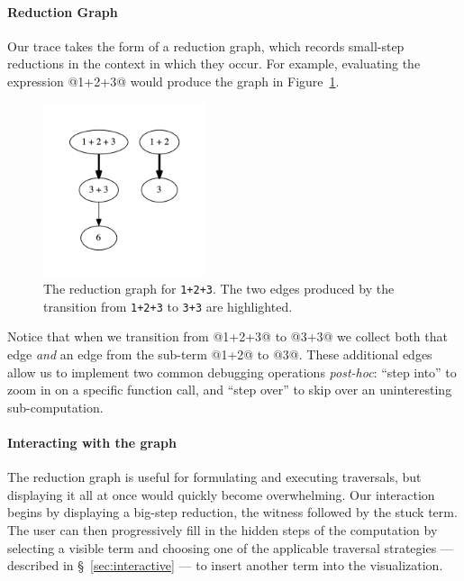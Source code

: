 \paragraph{Reduction Graph}
Our trace takes the form of a reduction graph, which records small-step
reductions in the context in which they occur.
%
%
For example, evaluating the expression @1+2+3@ would produce the
graph in Figure~\ref{fig:simple-reduction-hi}.
%
\begin{figure}[t]
  \centering
  \includegraphics[height=2in]{simple.png}
  \caption{The reduction graph for \texttt{1+2+3}. The two edges
    produced by the transition from \texttt{1+2+3} to \hbox{\texttt{3+3}}
    are highlighted.}
\label{fig:simple-reduction-hi}
\end{figure}
%
Notice that when we transition from @1+2+3@ to @3+3@ we collect
both that edge \emph{and} an edge from the sub-term @1+2@ to @3@.
%
These additional edges allow us to implement two common debugging
operations \emph{post-hoc}: ``step into'' to zoom in on a specific
function call, and ``step over'' to skip over an uninteresting
sub-computation.

\paragraph{Interacting with the graph}
The reduction graph is useful for formulating and executing traversals,
but displaying it all at once would quickly become overwhelming.
%
Our interaction begins by displaying a big-step reduction, \ie the
witness followed by the stuck term.
%
The user can then progressively fill in the hidden steps of the
computation by selecting a visible term and choosing one of the
applicable traversal strategies --- described in
\S~\ref{sec:interactive} --- to insert another term into the
visualization.

